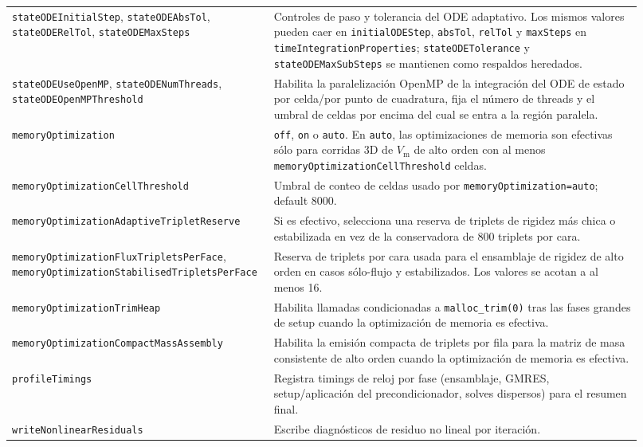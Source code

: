 \documentclass[11pt,a4paper]{article}
\newcommand{\code}[1]{\texttt{\small #1}}
\newcommand{\Vm}{V_{\text{m}}}
\begin{document}
\begin{longtable}{@{}p{0.34\linewidth}p{0.58\linewidth}@{}}
\code{stateODEInitialStep}, \code{stateODEAbsTol}, \code{stateODERelTol}, \code{stateODEMaxSteps} & Controles de paso y tolerancia del ODE adaptativo. Los mismos valores pueden caer en \code{initialODEStep}, \code{absTol}, \code{relTol} y \code{maxSteps} en \code{timeIntegrationProperties}; \code{stateODETolerance} y \code{stateODEMaxSubSteps} se mantienen como respaldos heredados. \\
\code{stateODEUseOpenMP}, \code{stateODENumThreads}, \code{stateODEOpenMPThreshold} & Habilita la paralelización OpenMP de la integración del ODE de estado por celda/por punto de cuadratura, fija el número de threads y el umbral de celdas por encima del cual se entra a la región paralela. \\
\code{memoryOptimization} & \code{off}, \code{on} o \code{auto}. En \code{auto}, las optimizaciones de memoria son efectivas sólo para corridas 3D de $\Vm$ de alto orden con al menos \code{memoryOptimizationCellThreshold} celdas. \\
\code{memoryOptimizationCellThreshold} & Umbral de conteo de celdas usado por \code{memoryOptimization=auto}; default 8000. \\
\code{memoryOptimizationAdaptiveTripletReserve} & Si es efectivo, selecciona una reserva de triplets de rigidez más chica o estabilizada en vez de la conservadora de 800 triplets por cara. \\
\code{memoryOptimizationFluxTripletsPerFace}, \code{memoryOptimizationStabilisedTripletsPerFace} & Reserva de triplets por cara usada para el ensamblaje de rigidez de alto orden en casos sólo-flujo y estabilizados. Los valores se acotan a al menos 16. \\
\code{memoryOptimizationTrimHeap} & Habilita llamadas condicionadas a \code{malloc\_trim(0)} tras las fases grandes de setup cuando la optimización de memoria es efectiva. \\
\code{memoryOptimizationCompactMassAssembly} & Habilita la emisión compacta de triplets por fila para la matriz de masa consistente de alto orden cuando la optimización de memoria es efectiva. \\
\code{profileTimings} & Registra timings de reloj por fase (ensamblaje, GMRES, setup/aplicación del precondicionador, solves dispersos) para el resumen final. \\
\code{writeNonlinearResiduals} & Escribe diagnósticos de residuo no lineal por iteración. \\
\bottomrule
\end{longtable}
\end{document}
